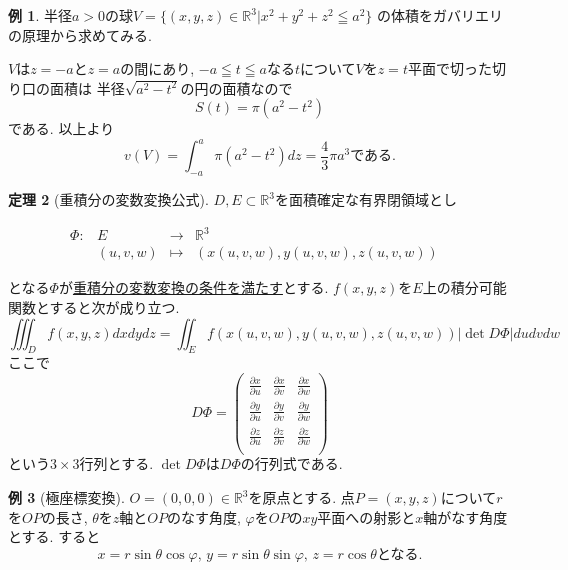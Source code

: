 \documentclass[dvipdfmx,a4paper,11pt]{article}
\newcommand{\R}{\mathbb{R}}
\theoremstyle{definition}
\newtheorem{thm}{定理}
\newtheorem{exa}[thm]{例}
\newcommand{\pdrv}[2]{\frac{\partial #1}{\partial #2}}
\begin{document}
\begin{exa}
半径$a>0$の球$
V = \{ (x,y,z) \in \R^3 | x^2 + y^2 + z^2 \leqq a^2\}
$
の体積をガバリエリの原理から求めてみる.

$V$は$z=-a$と$z=a$の間にあり, $-a \leqq t \leqq a$なる$t$について$V$を$z=t$平面で切った切り口の面積は
半径$\sqrt{a^2 - t^2}$の円の面積なので
$$
S(t) = \pi(a^2 - t^2)
$$
である. 
以上より
$$
v(V) = \int_{-a}^{a}\pi(a^2 - t^2)dz = \frac{4}{3}\pi a^3 \text{である.}
$$
\end{exa}

 \begin{tcolorbox}[
    colback = white,
    colframe = green!35!black,
    fonttitle = \bfseries,
    breakable = true]
 \begin{thm}[重積分の変数変換公式]
$D, E \subset \R^3$を面積確定な有界閉領域とし

 $$
\begin{array}{ccccc}
\Phi: &E & \rightarrow & \R^3 & \\
&(u,v,w) & \longmapsto & (x(u,v,w),y(u,v,w),z(u,v,w))&
\end{array}
$$

となる$\Phi$が\underline{重積分の変数変換の条件を満たす}とする. 
$f(x,y,z)$を$E$上の積分可能関数とすると次が成り立つ.
$$
\iiint_{D}f(x,y,z)dxdydz=\iint_{E} f(x(u,v,w),y(u,v,w), z(u,v,w))|\det D \Phi|dudvdw
$$
ここで
$$
D\Phi=
\left(
\begin{array}{ccc}
 \pdrv{x}{u} & \pdrv{x}{v} & \pdrv{x}{w}\\
 \pdrv{y}{u}& \pdrv{y}{v} & \pdrv{y}{w}\\ 
 \pdrv{z}{u}& \pdrv{z}{v} & \pdrv{z}{w}\\ 
\end{array} 
\right)
$$
という$3 \times 3$行列とする. $\det D \Phi$は$D\Phi$の行列式である.
 \end{thm}
\end{tcolorbox}

\begin{exa}[極座標変換]
$O = (0,0,0) \in \R^3$を原点とする.
点$P=(x,y,z)$について$r$を$OP$の長さ, $\theta$を$z$軸と$OP$のなす角度, $\varphi$を$OP$の$xy$平面への射影と$x$軸がなす角度とする.
すると
$$
x = r\sin \theta \cos \varphi, \, y =  r\sin \theta \sin \varphi,  \, z = r\cos \theta \text{となる.}
$$
\end{exa}
\end{document}
